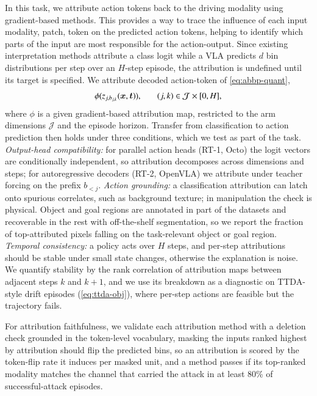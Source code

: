 \documentclass[11pt,letterpaper]{article}
\begin{document}
In this task, we attribute action tokens back to the driving modality using gradient-based methods. 
This provides a way to trace the influence of each input modality, patch, token on the predicted action tokens, helping to identify which parts of the input are most responsible for the action-output. %
Since existing interpretation methods attribute  a class logit while a VLA predicts $d$ bin distributions per step over an $H$-step episode, the attribution is undefined until its target is specified. We attribute decoded action-token of \autoref{eq:abbp-quant},
\vspace{-1.5ex}\begin{equation}
  \small
\phi\bigl(z_{j,b_{j,k}}(\bm{x},\bm{t})\bigr),\qquad (j,k)\in\mathcal{J}\times[0,H],
\label{eq:attr-target}
\vspace{-1.5ex}\end{equation}
where $\phi$ is a given gradient-based attribution map, restricted to the arm dimensions $\mathcal{J}$ and the episode horizon. 
Transfer from classification to action prediction then holds under three conditions, which we test as part of the task.
 \emph{Output-head compatibility:} for parallel action heads (\eg RT-1, Octo) the logit vectors are conditionally independent, so attribution decomposes across dimensions and steps; for autoregressive decoders (\eg RT-2, OpenVLA) we attribute under teacher forcing on the prefix $b_{<j}$.
 \emph{Action grounding:} a classification attribution can latch onto spurious correlates, such as background texture; in manipulation the check is physical. Object and goal regions are annotated in part of the datasets and recoverable in the rest with off-the-shelf segmentation, so we report the fraction of top-attributed pixels falling on the task-relevant object or goal region.
 \emph{Temporal consistency:} a policy acts over $H$ steps, and per-step attributions should be stable under small state changes, otherwise the explanation is noise. We quantify stability by the rank correlation of attribution maps between adjacent steps $k$ and $k{+}1$, and we use its breakdown as a diagnostic on TTDA-style drift episodes (\autoref{eq:ttda-obj}), where per-step actions are feasible but the trajectory fails.


For {attribution faithfulness}, we validate each attribution method with a deletion check grounded in the token-level vocabulary, \ie masking the inputs ranked highest by attribution should flip the predicted bins, so an attribution is scored by the token-flip rate it induces per masked unit, and a method passes if its top-ranked modality matches the channel that carried the attack in at least 80\% of successful-attack episodes.
\end{document}
